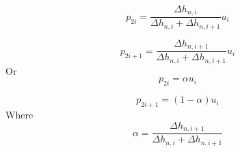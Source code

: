 \documentclass[11pt]{article}
\begin{document}
\begin{equation}
	p_{2i} = \frac{\Delta h_{n,i}}{\Delta h_{n,i} + \Delta h_{n,i+1}} u_i
\end{equation}

\begin{equation}
	p_{2i+1} = \frac{\Delta h_{n,i+1}}{\Delta h_{n,i} + \Delta h_{n,i+1}} u_i
\end{equation}
Or
\begin{equation}
	p_{2i} = \alpha u_i
\end{equation}

\begin{equation}
	p_{2i+1} = (1-\alpha) u_i
\end{equation}
Where
\begin{equation}
	\alpha = \frac{\Delta h_{n,i+1}}{\Delta h_{n,i} + \Delta h_{n,i+1}}
\end{equation}
\end{document}
